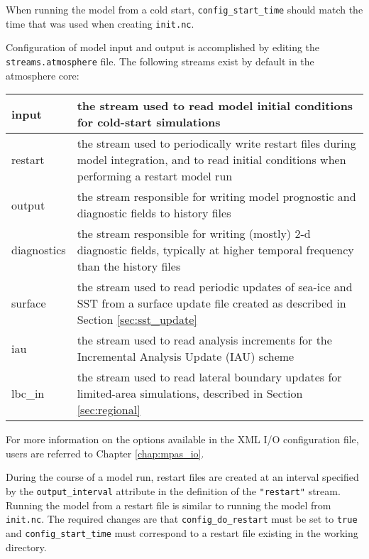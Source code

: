 When running the model from a cold start, {\tt config\_start\_time} should match the time that was used when creating {\tt init.nc}.

Configuration of model input and output is accomplished by editing the {\tt streams.atmosphere} file. The following streams exist by default in the atmosphere
core:

\begin{longtable}{|p{1.25in} |p{5.0in}|}
\hline
   input    & the stream used to read model initial conditions for cold-start simulations \\ \hline
   restart  & the stream used to periodically write restart files during model integration, and to read initial conditions when performing a restart model run \\ \hline
   output   & the stream responsible for writing model prognostic and diagnostic fields to history files \\ \hline
   diagnostics & the stream responsible for writing (mostly) 2-d diagnostic fields, typically at higher temporal frequency than the history files \\ \hline
   surface  & the stream used to read periodic updates of sea-ice and SST from a surface update file created as described in Section 
\ref{sec:sst_update} \\ \hline
   iau      & the stream used to read analysis increments for the Incremental Analysis Update (IAU) scheme \\ \hline
   lbc\_in  & the stream used to read lateral boundary updates for limited-area simulations, described in Section \ref{sec:regional} \\ \hline
\end{longtable}

\noindent For more information on the options available in the XML I/O configuration file, users are referred to Chapter \ref{chap:mpas_io}.

During the course of a model run, restart files are created at an interval specified by the {\tt output\_interval} attribute in the definition of the {\tt "restart"} stream. Running the model from a restart file is similar to running the model from {\tt init.nc}.  The required changes are that {\tt config\_do\_restart} must be set to {\tt true} and {\tt config\_start\_time} must correspond to a restart file existing in the working directory.

